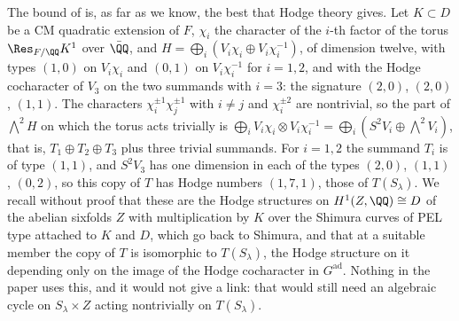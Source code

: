 \begin{remark}
\label{rem:mumfordunitary}
The bound of  is, as far as we know, the best that
Hodge theory gives. Let $K\subset D$ be a CM quadratic extension of $F$,
$\chi_{i}$ the character of the $i$-th factor of the torus
$\Res_{F/\QQ}K^{1}$ over $\bar{\QQ}$, and
$H=\bigoplus_{i}(V_{i}\chi_{i}\oplus V_{i}\chi_{i}^{-1})$, of dimension twelve,
with types $(1,0)$ on $V_{i}\chi_{i}$ and $(0,1)$ on $V_{i}\chi_{i}^{-1}$ for
$i=1,2$, and with the Hodge cocharacter of $V_{3}$ on the two summands with
$i=3$: the signature $(2,0)$, $(2,0)$, $(1,1)$. The characters
$\chi_{i}^{\pm1}\chi_{j}^{\pm1}$ with $i\ne j$ and $\chi_{i}^{\pm2}$ are
nontrivial, so the part of $\bigwedge^{2}H$ on which the torus acts trivially
is $\bigoplus_{i}V_{i}\chi_{i}\otimes V_{i}\chi_{i}^{-1}=\bigoplus_{i}
(S^{2}V_{i}\oplus\bigwedge^{2}V_{i})$, that is, $T_{1}\oplus T_{2}\oplus T_{3}$
plus three trivial summands. For $i=1,2$ the summand $T_{i}$ is of type
$(1,1)$, and $S^{2}V_{3}$ has one dimension in each of the types $(2,0)$,
$(1,1)$, $(0,2)$, so this copy of $T$ has Hodge numbers $(1,7,1)$, those of
$T(S_{\lambda})$. We recall
without proof that these are the Hodge structures on $H^{1}(Z,\QQ)\cong D$ of
the abelian sixfolds $Z$ with multiplication by $K$ over the Shimura curves of
PEL type attached to $K$ and $D$, which go back to Shimura, and that at a
suitable member the copy of $T$ is isomorphic to $T(S_{\lambda})$, the Hodge
structure on it depending only on the image of the Hodge cocharacter in
$G^{\mathrm{ad}}$. Nothing in the paper uses this, and it would not give a
link: that would still need an algebraic cycle on $S_{\lambda}\times Z$ acting
nontrivially on $T(S_{\lambda})$.
\end{remark}


